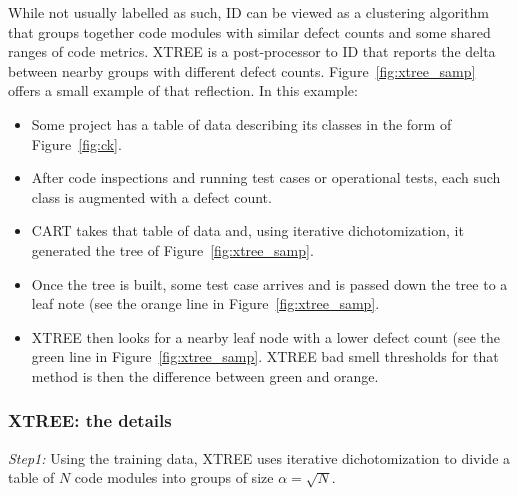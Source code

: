 \documentclass{sig-alternate}
\newcommand{\fig}[1]{Figure~\ref{fig:#1}}
\begin{document}
{  While not usually labelled as such, ID can
  be viewed as a clustering algorithm that groups together code modules
  with similar defect counts and some shared ranges of code metrics.
  XTREE is a post-processor to ID that reports the delta between 
  nearby groups with different defect counts. \fig{xtree_samp} offers
  a small example of that reflection. In this example:
  \begin{itemize}
      \item Some project has a table of data describing its  classes in the form of \fig{ck}.
      \item After code inspections and running test cases or operational
      tests, each such class is augmented with a defect count.
      \item CART takes that table of data and, using iterative dichotomization,
      it generated the tree of \fig{xtree_samp}.
      \item Once the tree is built, some test case arrives and is passed
      down the tree to a leaf note (see the orange line in \fig{xtree_samp}.
      \item XTREE then looks for a nearby leaf node with a lower defect
      count (see the green line in \fig{xtree_samp}. XTREE bad smell
      thresholds for that method is then the difference between 
      green and orange.
  \end{itemize}
  
  
\subsubsection{XTREE: the details}

 {\em Step1:} Using the training data,  XTREE uses iterative dichotomization to
  divide a table of $N$ code modules  into  groups of
size $\alpha=\sqrt{N}$.

}
\end{document}
